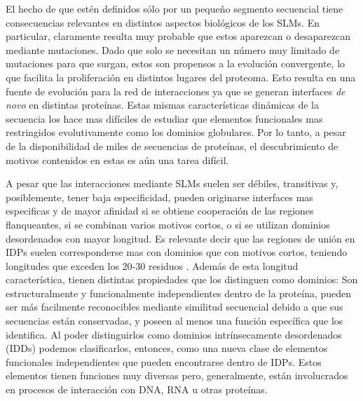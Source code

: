 % 
% 
El hecho de que estén definidos sólo por un pequeño segmento secuencial tiene consecuencias relevantes en distintos aspectos biológicos de los SLMs.
En particular, claramente resulta muy probable que estos aparezcan o desaparezcan mediante mutaciones. 
Dado que solo se necesitan un número muy limitado de mutaciones para que surgan, estos son propensos a la evolución convergente, lo que facilita la proliferación en distintos lugares del proteoma.
Esto resulta en una fuente de evolución para la red de interacciones ya que se generan interfaces \textit{de novo} en distintas proteínas.
Estas mismas características dinámicas de la secuencia los hace mas difíciles de estudiar que elementos funcionales mas restringidos evolutivamente como los dominios globulares.
Por lo tanto, a pesar de la disponibilidad de miles de secuencias de proteínas, el descubrimiento de motivos contenidos en estas es aún una tarea difícil.







A pesar que las interacciones mediante SLMs suelen ser débiles, transitivas y, posiblemente, tener baja especificidad, pueden originarse interfaces mas especificas y de mayor afinidad si 
se obtiene cooperación de las regiones flanqueantes, si se combinan varios motivos cortos, o si se utilizan dominios desordenados con mayor longitud.
Es relevante decir que las regiones de unión en IDPs suelen corresponderse mas con dominios que con motivos cortos, teniendo longitudes que exceden los 20-30 residuos 
\cite{tompa2009close,chen2006conservation,chen2006conservationB}.  
Además de esta longitud característica, tienen distintas propiedades que los distinguen como dominios:
Son estructuralmente y funcionalmente independientes dentro de la proteína, pueden ser más facilmente reconocibles mediante similitud secuencial debido a que sus secuencias están conservadas, 
y poseen al menos una función específica que los identifica.
Al poder distinguirlos como dominios intrínsecamente desordenados (IDDs) podemos clasificarlos, entonces, como una nueva clase de elementos funcionales independientes que pueden encontrarse dentro de IDPs.
Estos elementos tienen funciones muy diversas pero, generalmente, están involucrados en procesos de interacción con DNA, RNA u otras proteínas.









